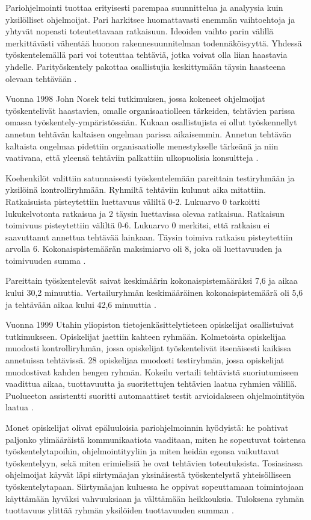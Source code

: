 \documentclass[finnish]{tktltiki2}
\theoremstyle{definition}
\theoremstyle{remark}
\begin{document}
Pariohjelmointi tuottaa erityisesti parempaa suunnittelua ja analyysia kuin yksilölliset ohjelmoijat. Pari harkitsee huomattavasti enemmän vaihtoehtoja ja yhtyvät nopeasti toteutettavaan ratkaisuun. Ideoiden vaihto parin välillä merkittävästi vähentää huonon rakennesuunnitelman todennäköisyyttä.  Yhdessä työskentelemällä pari voi toteuttaa tehtäviä, jotka voivat olla liian haastavia yhdelle. Parityöskentely pakottaa osallistujia keskittymään täysin haasteena olevaan tehtävään \cite{WIL00}.

Vuonna 1998 John Nosek teki tutkimuksen, jossa kokeneet ohjelmoijat työskentelivät haastavien, omalle organisaatiolleen tärkeiden, tehtävien parissa omassa työskentely-ympäristössään. Kukaan osallistujista ei ollut työskennellyt annetun tehtävän kaltaisen ongelman parissa aikaisemmin. Annetun tehtävän kaltaista ongelmaa pidettiin organisaatiolle menestykselle tärkeänä ja niin vaativana, että yleensä tehtäviin palkattiin ulkopuolisia konsultteja \cite{NOS98}.

Koehenkilöt valittiin satunnaisesti työskentelemään pareittain testiryhmään ja yksilöinä kontrolliryhmään.
Ryhmiltä tehtäviin kulunut aika mitattiin. Ratkaisuista pisteytettiin luettavuus väliltä 0-2. Lukuarvo 0 tarkoitti lukukelvotonta ratkaisua ja 2 täysin luettavissa olevaa ratkaisua. Ratkaisun toimivuus pisteytettiin väliltä 0-6. Lukuarvo 0 merkitsi, että ratkaisu ei saavuttanut annettua tehtävää lainkaan. Täysin toimiva ratkaisu pisteytettiin arvolla 6. Kokonaispistemäärän maksimiarvo oli 8, joka oli luettavuuden ja toimivuuden summa \cite{NOS98}.

Pareittain työskentelevät saivat keskimäärin kokonaispistemääräksi 7,6 ja aikaa kului 30,2 minuuttia. Vertailuryhmän keskimääräinen kokonaispistemäärä oli 5,6 ja tehtävään aikaa kului 42,6 minuuttia \cite{NOS98}.

Vuonna 1999 Utahin yliopiston tietojenkäsittelytieteen opiskelijat osallistuivat tutkimukseen. Opiskelijat jaettiin kahteen ryhmään. Kolmetoista opiskelijaa muodosti kontrolliryhmän, jossa opiskelijat työskentelivät itsenäisesti kaikissa annetuissa tehtävissä. 28 opiskelijaa muodosti testiryhmän, jossa opiskelijat muodostivat kahden hengen ryhmän. Kokeilu vertaili tehtävistä suoriutumiseen vaadittua aikaa, tuottavuutta ja suoritettujen tehtävien laatua ryhmien välillä. Puolueeton assistentti suoritti automaattiset testit arvioidakseen ohjelmointityön laatua \cite{WIL00}.

Monet opiskelijat olivat epäluuloisia pariohjelmoinnin hyödyistä: he pohtivat paljonko ylimääräistä kommunikaatiota vaaditaan, miten he sopeutuvat toistensa työskentelytapoihin, ohjelmointityyliin ja miten heidän egonsa vaikuttavat työskentelyyn, sekä miten erimielisiä he ovat tehtävien toteutuksista. Tosiasiassa ohjelmoijat käyvät läpi siirtymäajan yksinäisestä työskentelystä yhteisölliseen työskentelytapaan. Siirtymäajan kuluessa he oppivat sopeuttamaan toimintojaan käyttämään hyväksi vahvuuksiaan ja välttämään heikkouksia. Tuloksena ryhmän tuottavuus ylittää ryhmän yksilöiden tuottavuuden summan \cite{WIL00}.
\end{document}
